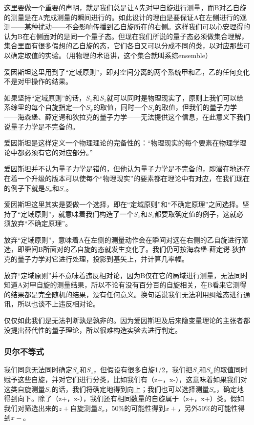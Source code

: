 这里要做一个重要的声明，就是我们总是让A先对甲自旋进行测量，而B对乙自旋的测量是在A完成测量的瞬间进行的。如此设计的理由是要保证A在左侧进行的观测——某种扰动——不会影响传播到乙自旋所在的右侧。这样我们可以心安理得的认为B在右侧面对的是同一个量子态。但现在我们所说的量子态必须做集合理解，集合里面有很多假想的乙自旋的态，它们各自又可以分成不同的类，以对应那些可以确定取值的实验。（用物理的术语讲，这个集合就叫系综ensemble）

爱因斯坦这里用到了“定域原则”，即对空间分离的两个系统甲和乙，乙的任何变化不是对甲操作的结果。

如果坚持“定域原则”的话，$S_x$和$S_z$就可以同时是物理现实了，原则上我们可以给系综里的每个自旋指定一个$S_x$的取值，同时一个$S_z$的取值，但我们的量子力学——海森堡、薛定谔和狄拉克的量子力学——无法提供这个信息，在此意义下我们说量子力学是不完备的。

爱因斯坦是这样定义一个物理理论的完备性的：“物理现实的每个要素在物理学理论中都必须有它的对应部分。”

爱因斯坦并不认为量子力学是错的，但他认为量子力学是不完备的，即潜在地还存在着一个升级的版本可以使每个“物理现实”的要素都在理论中有对应，在我们现在的例子下就是$S_x$和$S_z$。

爱因斯坦这里其实是要做一个选择，即在“定域原则”和“不确定原理”之间选择。坚持了“定域原则”，就意味着我们构造了一个$S_x$和$S_z$都要取确定值的例子，这就必须放弃“不确定原理”。

放弃“定域原则”，意味着A在左侧的测量动作会在瞬间对远在右侧的乙自旋进行筛选，即瞬间B所面对的乙自旋的态就发生变化了。我们仍可按海森堡-薛定谔-狄拉克的量子力学对它进行处理，投影到基矢上，并计算几率幅。

放弃“定域原则”并不意味着违反相对论，因为B仅在它的局域进行测量，无法同时知道A对甲自旋的测量结果，所以不论有没有百分百的自旋相关，在B看来它测得的结果都是完全随机的结果，没有任何意义。换句话说我们无法利用纠缠态进行通讯，所以也谈不上违反相对论。

仅仅如此我们是无法判断孰是孰非的。因为爱因斯坦及后来隐变量理论的主张者都没提出替代性的量子理论，所以很难构造实验去进行判定。

\subsubsection{贝尔不等式}

我们同意无法同时确定$S_x$和$S_z$，但假设有很多自旋1/2，我们把$S_z$和$S_x$的取值同时赋予这些自旋，并对它们进行分类，比如我们有（z+，x-），这意味着如果我们对这类自旋测量$S_z$的话，我们将确定地得到向上；我们也可以选择测量$S_x$，确定地得到向下。除了（z+，x-），我们还有相同数量的自旋属于（z+，x+）类。假如我们对筛选出来的$z+$自旋测量$S_x$，50\%的可能性得到$x+$，另外50\%的可能性得到$x-$。

